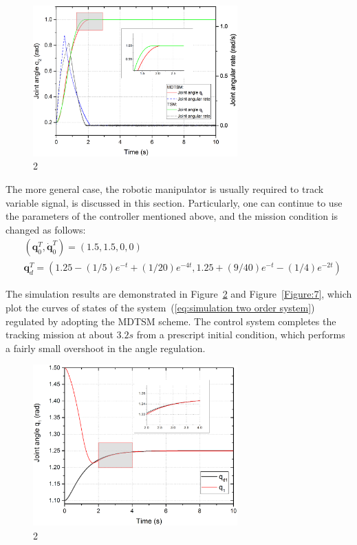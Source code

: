 \documentclass[3p]{elsarticle}
\theoremstyle{plain}
\theoremstyle{remark}
\begin{document}
\begin{figure}
\centering
\includegraphics[width=0.7\textwidth]{paper3_fig5.eps}
\caption{2}
\label{Figure:5}
\end{figure}
The more general case, the robotic manipulator is usually required to track variable signal, is discussed in this section. Particularly, one can continue to use the parameters of the controller mentioned above, and the mission condition is changed as follows:
\begin{align*}
&(\bm q_0^T, \dot{\bm q}_0^T)= (1.5,1.5,0,0)\\
&{\bm q}_d^T=(1.25-(1/5)e^{-t}+(1/20)e^{-4t},1.25+(9/40)e^{-t}-(1/4)e^{-2t})
\end{align*}\par
The simulation results are demonstrated in Figure~\ref{Figure:6} and Figure~\ref{Figure:7}, which plot the curves of states of the system~(\ref{eq:simulation two order system}) regulated by adopting the MDTSM scheme. The control system completes the tracking mission at about $3.2s$ from a prescript initial condition, which performs a fairly small overshoot in the angle regulation.
\begin{figure}
\centering
\includegraphics[width=0.7\textwidth]{paper3_fig6.eps}
\caption{2}
\label{Figure:6}
\end{figure}
\end{document}

